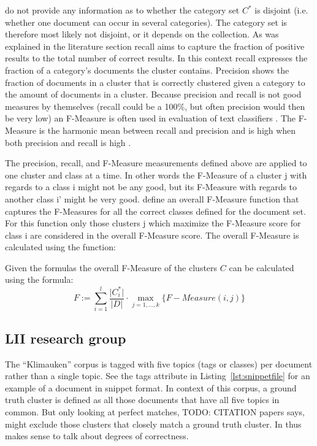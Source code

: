 \cite{Chim2007} do not provide any information as to whether the category set \(C^*\) is disjoint (i.e. whether one document can occur in several categories). The category set is therefore most likely not disjoint, or it depends on the collection. As was explained in the literature section recall aims to capture the fraction of positive results to the total number of correct results. In this context recall expresses the fraction of a category's documents the cluster contains. Precision shows the fraction of documents in a cluster that is correctly clustered given a category to the amount of documents in a cluster. Because precision and recall is not good measures by themselves (recall could be a 100\%, but often precision would then be very low) an F-Measure is often used in evaluation of text classifiers \cite{Baeza-Yates2011a}. The F-Measure is the harmonic mean between recall and precision and is high when both precision and recall is high \cite{Baeza-Yates2011b}. 

The precision, recall, and F-Measure measurements defined above are applied to one cluster and class at a time. In other words the F-Measure of a cluster j with regards to a class i might not be any good, but its F-Measure with regards to another class i' might be very good. \cite{Chim2007} define an overall F-Measure function that captures the F-Measures for all the correct classes defined for the document set. For this function only those clusters j which maximize the F-Measure score for class i are considered in the overall F-Measure score. The overall F-Measure is calculated using the function:

Given the formulas the overall F-Measure of the clusters \(C\) can be calculated using the formula:
\begin{displaymath}
F := \sum_{i=1}^{l} \frac{\vert C_i^* \vert}{\vert D \vert} \cdot \max_{j=1,\dots,k} \{F-Measure(i,j)\}
\end{displaymath}

\subsection{LII research group}
The ``Klimauken'' corpus is tagged with five topics (tags or classes) per document rather than a single topic. See the tags attribute in Listing~\ref{lst:snippetfile} for an example of a document in snippet format. In context of this corpus, a ground truth cluster is defined as all those documents that have all five topics in common. But only looking at perfect matches, TODO: CITATION papers says, might exclude those clusters that closely match a ground truth cluster. In thus makes sense to talk about degrees of correctness. 

